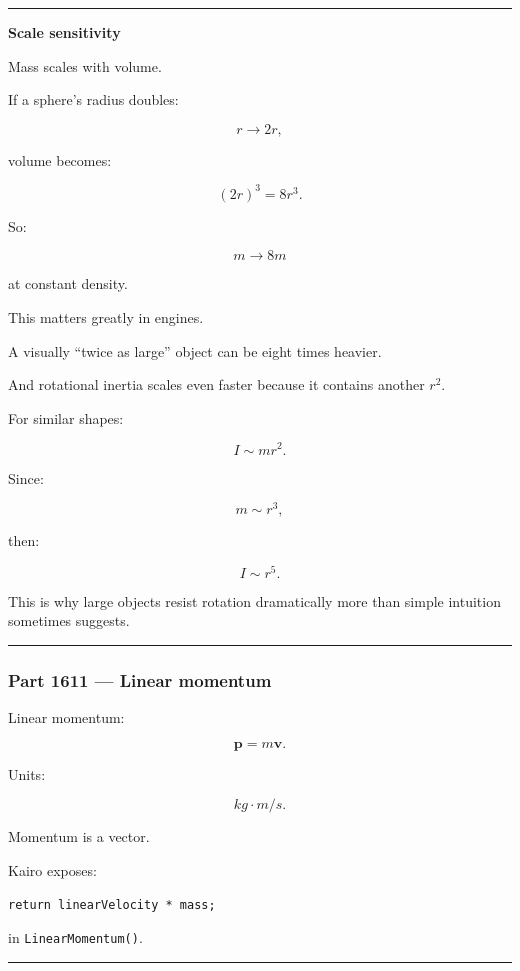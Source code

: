 \begin{center}\rule{0.5\linewidth}{0.5pt}\end{center}

\textbf{Scale sensitivity}

Mass scales with volume.

If a sphere's radius doubles:

\[
r\rightarrow2r,
\]

volume becomes:

\[
(2r)^3=8r^3.
\]

So:

\[
m\rightarrow8m
\]

at constant density.

This matters greatly in engines.

A visually ``twice as large'' object can be eight times heavier.

And rotational inertia scales even faster because it contains another \(r^2\).

For similar shapes:

\[
I\sim mr^2.
\]

Since:

\[
m\sim r^3,
\]

then:

\[
\boxed{
I\sim r^5.
}
\]

This is why large objects resist rotation dramatically more than simple intuition sometimes suggests.

\begin{center}\rule{0.5\linewidth}{0.5pt}\end{center}

\subsubsection{Part 1611 --- Linear momentum}\label{part-1611-linear-momentum}

Linear momentum:

\[
\boxed{
\mathbf{p}=m\mathbf{v}.
}
\]

Units:

\[
kg\cdot m/s.
\]

Momentum is a vector.

Kairo exposes:

\begin{verbatim}
return linearVelocity * mass;
\end{verbatim}

in \texttt{LinearMomentum()}.

\begin{center}\rule{0.5\linewidth}{0.5pt}\end{center}

